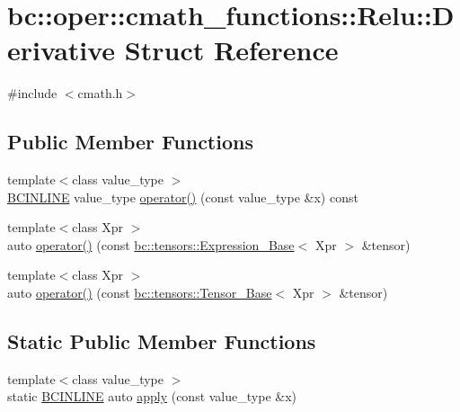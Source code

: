 \hypertarget{structbc_1_1oper_1_1cmath__functions_1_1Relu_1_1Derivative}{}\section{bc\+:\+:oper\+:\+:cmath\+\_\+functions\+:\+:Relu\+:\+:Derivative Struct Reference}
\label{structbc_1_1oper_1_1cmath__functions_1_1Relu_1_1Derivative}


{\ttfamily \#include $<$cmath.\+h$>$}

\subsection*{Public Member Functions}
\begin{DoxyCompactItemize}
\item 
{\footnotesize template$<$class value\+\_\+type $>$ }\\\hyperlink{common_8h_a6699e8b0449da5c0fafb878e59c1d4b1}{B\+C\+I\+N\+L\+I\+NE} value\+\_\+type \hyperlink{structbc_1_1oper_1_1cmath__functions_1_1Relu_1_1Derivative_a712d32c1263ad15951d8eff665e15cac}{operator()} (const value\+\_\+type \&x) const
\item 
{\footnotesize template$<$class Xpr $>$ }\\auto \hyperlink{structbc_1_1oper_1_1cmath__functions_1_1Relu_1_1Derivative_a3338bc87cd35a4ed1922dde76bcdea04}{operator()} (const \hyperlink{classbc_1_1tensors_1_1Expression__Base}{bc\+::tensors\+::\+Expression\+\_\+\+Base}$<$ Xpr $>$ \&tensor)
\item 
{\footnotesize template$<$class Xpr $>$ }\\auto \hyperlink{structbc_1_1oper_1_1cmath__functions_1_1Relu_1_1Derivative_a6fd4b76361355497003a1907045f52c3}{operator()} (const \hyperlink{classbc_1_1tensors_1_1Tensor__Base}{bc\+::tensors\+::\+Tensor\+\_\+\+Base}$<$ Xpr $>$ \&tensor)
\end{DoxyCompactItemize}
\subsection*{Static Public Member Functions}
\begin{DoxyCompactItemize}
\item 
{\footnotesize template$<$class value\+\_\+type $>$ }\\static \hyperlink{common_8h_a6699e8b0449da5c0fafb878e59c1d4b1}{B\+C\+I\+N\+L\+I\+NE} auto \hyperlink{structbc_1_1oper_1_1cmath__functions_1_1Relu_1_1Derivative_a53c68a9a63868f899cae5a314515babf}{apply} (const value\+\_\+type \&x)
\end{DoxyCompactItemize}


